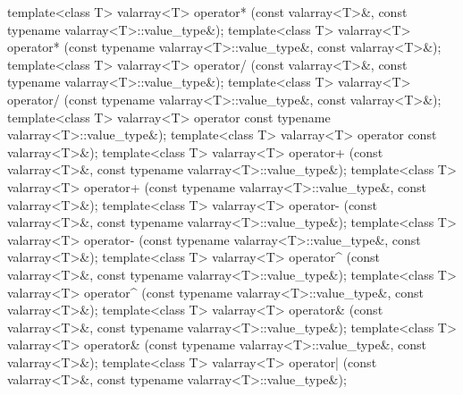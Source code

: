 %
%
%
%
%
%
%
%
%
%
\begin{itemdecl}
template<class T> valarray<T> operator* (const valarray<T>&,
                                         const typename valarray<T>::value_type&);
template<class T> valarray<T> operator* (const typename valarray<T>::value_type&,
                                         const valarray<T>&);
template<class T> valarray<T> operator/ (const valarray<T>&,
                                         const typename valarray<T>::value_type&);
template<class T> valarray<T> operator/ (const typename valarray<T>::value_type&,
                                         const valarray<T>&);
template<class T> valarray<T> operator%
                                         const typename valarray<T>::value_type&);
template<class T> valarray<T> operator%
                                         const valarray<T>&);
template<class T> valarray<T> operator+ (const valarray<T>&,
                                         const typename valarray<T>::value_type&);
template<class T> valarray<T> operator+ (const typename valarray<T>::value_type&,
                                         const valarray<T>&);
template<class T> valarray<T> operator- (const valarray<T>&,
                                         const typename valarray<T>::value_type&);
template<class T> valarray<T> operator- (const typename valarray<T>::value_type&,
                                         const valarray<T>&);
template<class T> valarray<T> operator^ (const valarray<T>&,
                                         const typename valarray<T>::value_type&);
template<class T> valarray<T> operator^ (const typename valarray<T>::value_type&,
                                         const valarray<T>&);
template<class T> valarray<T> operator& (const valarray<T>&,
                                         const typename valarray<T>::value_type&);
template<class T> valarray<T> operator& (const typename valarray<T>::value_type&,
                                         const valarray<T>&);
template<class T> valarray<T> operator| (const valarray<T>&,
                                         const typename valarray<T>::value_type&);

\end{itemdecl}

